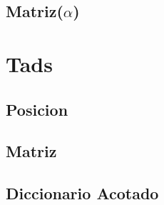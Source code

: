 \documentclass[a4paper,10pt, nofootinbib]{article}
\begin{document}
\subsection{Matriz($\alpha$)}



\section{Tads}
\subsection{Posicion}


\subsection{Matriz}


\subsection{Diccionario Acotado}

\end{document}
